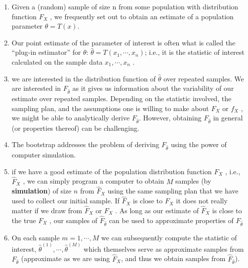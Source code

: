 \begin{enumerate}
    \item Given a (random) sample of size n from some population with distribution function $F_X$ , we frequently set out to obtain an estimate of a population parameter $\theta = T (x)$.
    \hfill \cite{statistics/book/Statistics-for-Data-Scientists/Maurits-Kaptein}

    \item Our point estimate of the parameter of interest is often what is called the “plug-in estimator” for $\theta$: $\hat{\theta} = T (x_1, \cdots , x_n )$; i.e., it is the statistic of interest calculated on the sample data $x_1, \cdots , x_n$ .
    \hfill \cite{statistics/book/Statistics-for-Data-Scientists/Maurits-Kaptein}

    \item we are interested in the distribution function of $\hat{\theta}$ over repeated samples.
    We are interested in $F_{\hat{\theta}}$ as it gives us information about the variability of our estimate over repeated samples.
    Depending on the statistic involved, the sampling plan, and the assumptions one is willing to make about $F_X$ or $f_X$ , we might be able to analytically derive $F_{\hat{\theta}}$.
    However, obtaining $F_{\hat{\theta}}$ in general (or properties thereof) can be challenging.
    \hfill \cite{statistics/book/Statistics-for-Data-Scientists/Maurits-Kaptein}

    \item The bootstrap addresses the problem of deriving $F_{\hat{\theta}}$ using the power of computer simulation.
    \hfill \cite{statistics/book/Statistics-for-Data-Scientists/Maurits-Kaptein}

    \item if we have a good estimate of the population distribution function $F_X$ , i.e., $\hat{F}_X$ , we can simply program a computer to obtain $M$ samples (by \textbf{simulation}) of size $n$ from $\hat{F}_X$ using the same sampling plan that we have used to collect our initial sample.
    If $\hat{F}_X$ is close to $F_X$ it does not really matter if we draw from $\hat{F}_X$ or $F_X$ .
    As long as our estimate of $\hat{F}_X$ is close to the true $F_X$ , our samples of $\hat{F}_{\hat{\theta}}$ can be used to approximate properties of $F_{\hat{\theta}}$
    \hfill \cite{statistics/book/Statistics-for-Data-Scientists/Maurits-Kaptein}

    \item On each sample $m = 1, \cdots , M$ we can subsequently compute the statistic of interest, $\hat{\theta}^{(1)} , \cdots , \hat{\theta}^{(M)}$ which themselves serve as approximate samples from $F_{\hat{\theta}}$ (approximate as we are using $\hat{F}_X $, and thus we obtain samples from $\hat{F}_{\hat{\theta}}$).
    \hfill \cite{statistics/book/Statistics-for-Data-Scientists/Maurits-Kaptein}


\end{enumerate}
